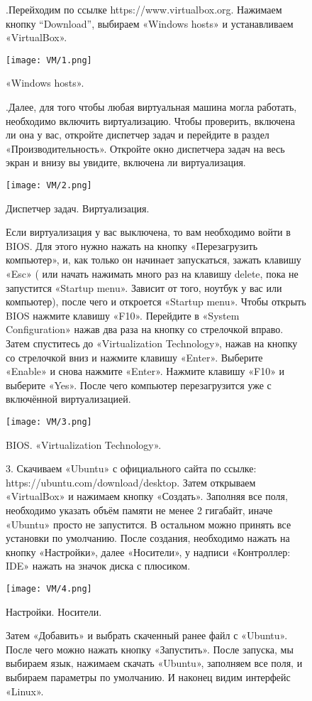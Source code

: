 
\begin{figure}
.\quad Перейходим по ссылке https://www.virtualbox.org. Нажимаем кнопку “Download”, выбираем «Windows hosts» и устанавливаем «VirtualBox».

		\centering
		\texttt{[image: VM/1.png]}
\caption{«Windows hosts».}
\label{ris:image}
\end{figure}

\begin{figure}
.\quad Далее, для того чтобы любая виртуальная машина могла работать, необходимо включить виртуализацию. Чтобы проверить, включена ли она у вас, откройте диспетчер задач и перейдите в раздел «Производительность». Откройте окно диспетчера задач на весь экран и внизу вы увидите, включена ли виртуализация.

		\centering
		\texttt{[image: VM/2.png]}
\caption{Диспетчер задач. Виртуализация.}
\label{ris:image}
\end{figure}

\begin{figure}
\quad Если виртуализация у вас выключена, то вам необходимо войти в BIOS. Для этого нужно нажать на кнопку «Перезагрузить компьютер», и, как только он начинает запускаться, зажать клавишу «Esc» ( или начать нажимать много раз на клавишу delete, пока не запустится «Startup menu». Зависит от того, ноутбук у вас или компьютер), после чего и откроется «Startup menu». Чтобы открыть BIOS нажмите клавишу «F10». Перейдите в «System Configuration» нажав два раза на кнопку со стрелочкой вправо. Затем спуститесь до «Virtualization Technology», нажав на кнопку со стрелочкой вниз и нажмите клавишу «Enter». Выберите «Enable» и снова нажмите «Enter». Нажмите клавишу «F10» и выберите «Yes». После чего компьютер перезагрузится уже с включённой виртуализацией.

		\centering
		\texttt{[image: VM/3.png]}
\caption{BIOS. «Virtualization Technology».}
\label{ris:image}
\end{figure}

\begin{figure}
3. Скачиваем «Ubuntu» с официального сайта по ссылке: https://ubuntu.com/download/desktop. Затем открываем «VirtualBox» и нажимаем кнопку «Создать». Заполняя все поля, необходимо указать объём памяти не менее 2 гигабайт, иначе «Ubuntu» просто не запустится. В остальном можно принять все установки по умолчанию. После создания, необходимо нажать на кнопку «Настройки», далее «Носители», у надписи «Контроллер: IDE» нажать на значок диска с плюсиком.

		\centering
		\texttt{[image: VM/4.png]}
\caption{Настройки. Носители.}
\label{ris:image}

\end{figure}

\begin{figure}
\quad Затем «Добавить» и выбрать скаченный ранее файл с «Ubuntu». После чего можно нажать кнопку «Запустить». После запуска, мы выбираем язык, нажимаем скачать «Ubuntu», заполняем все поля, и выбираем параметры по умолчанию. И наконец видим интерфейс «Linux».
\end{figure}


